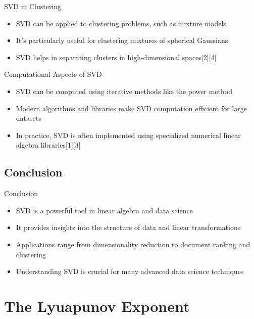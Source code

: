 \documentclass{beamer}
\begin{document}
\begin{frame}{SVD in Clustering}
    \begin{itemize}
        \item SVD can be applied to clustering problems, such as mixture models
        \item It's particularly useful for clustering mixtures of spherical Gaussians
        \item SVD helps in separating clusters in high-dimensional spaces[2][4]
    \end{itemize}
\end{frame}

\begin{frame}{Computational Aspects of SVD}
    \begin{itemize}
        \item SVD can be computed using iterative methods like the power method
        \item Modern algorithms and libraries make SVD computation efficient for large datasets
        \item In practice, SVD is often implemented using specialized numerical linear algebra libraries[1][3]
    \end{itemize}
\end{frame}
\subsection{Conclusion}
\begin{frame}{Conclusion}
    \begin{itemize}
        \item SVD is a powerful tool in linear algebra and data science
        \item It provides insights into the structure of data and linear transformations
        \item Applications range from dimensionality reduction to document ranking and clustering
        \item Understanding SVD is crucial for many advanced data science techniques
    \end{itemize}
\end{frame}

\section{The Lyuapunov Exponent}
\sectionpage
\end{document}

